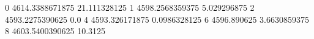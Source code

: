 0 4614.3388671875 21.111328125
1 4598.2568359375 5.029296875
2 4593.2275390625 0.0
4 4593.326171875 0.0986328125
6 4596.890625 3.6630859375
8 4603.5400390625 10.3125
